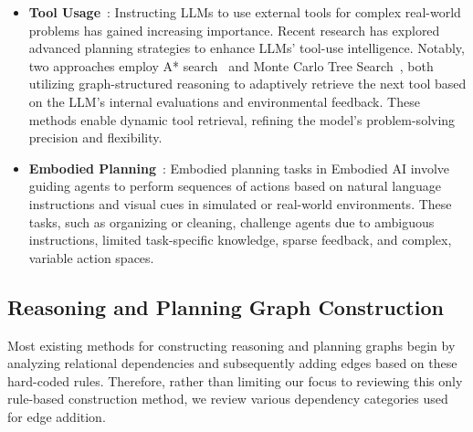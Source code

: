 \begin{itemize}[leftmargin=*]
    \item \textbf{Tool Usage}~\cite{zhuang2023toolchain, hao2023reasoning}: Instructing LLMs to use external tools for complex real-world problems has gained increasing importance. Recent research has explored advanced planning strategies to enhance LLMs' tool-use intelligence. Notably, two approaches employ A* search~\cite{zhuang2023toolchain} and Monte Carlo Tree Search~\cite{hao2023reasoning}, both utilizing graph-structured reasoning to adaptively retrieve the next tool based on the LLM's internal evaluations and environmental feedback. These methods enable dynamic tool retrieval, refining the model's problem-solving precision and flexibility.

    \item \textbf{Embodied Planning}~\cite{song2023llm, xu2024p}: Embodied planning tasks in Embodied AI involve guiding agents to perform sequences of actions based on natural language instructions and visual cues in simulated or real-world environments. These tasks, such as organizing or cleaning, challenge agents due to ambiguous instructions, limited task-specific knowledge, sparse feedback, and complex, variable action spaces.
\end{itemize}


\subsection{Reasoning and Planning Graph Construction}
Most existing methods for constructing reasoning and planning graphs begin by analyzing relational dependencies and subsequently adding edges based on these hard-coded rules. Therefore, rather than limiting our focus to reviewing this only rule-based construction method, we review various dependency categories used for edge addition.

